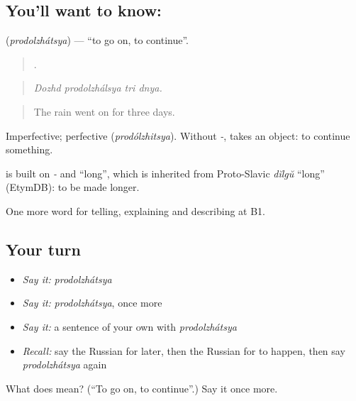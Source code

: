 \subsection*{You'll want to know: }
\textbf{} (\emph{prodolzhátsya}) — \textquotedblleft{}to go on, to continue\textquotedblright{}.

\begin{quote}
   .
\end{quote}

\begin{quote}
\emph{Dozhd prodolzhálsya tri dnya.}
\end{quote}

\begin{quote}
The rain went on for three days.
\end{quote}

Imperfective; perfective \emph{} (\emph{prodólzhitsya}). Without \emph{-}, \emph{} takes an object: to continue something.

\begin{cousinweb}
\emph{} is built on \emph{-} and \emph{} \textquotedblleft{}long\textquotedblright{}, which is inherited from Proto-Slavic \emph{dĭlgŭ} \textquotedblleft{}long\textquotedblright{} (EtymDB): to be made longer.
\end{cousinweb}

\begin{grammarlens}[title={What you've built}]
One more word for telling, explaining and describing at B1.
\end{grammarlens}

\subsection*{Your turn}
\begin{itemize}
\raggedright
  \item \emph{Say it:} \emph{prodolzhátsya}
  \item \emph{Say it:} \emph{prodolzhátsya}, once more
  \item \emph{Say it:} a sentence of your own with \emph{prodolzhátsya}
  \item \emph{Recall:} say the Russian for later, then the Russian for to happen, then say \emph{prodolzhátsya} again
\end{itemize}

\begin{tcolorbox}[breakable,colback=teal!4,colframe=teal!35!black,title={Before you move on}]
What does  mean? (\textquotedblleft{}To go on, to continue\textquotedblright{}.) Say it once more.
\end{tcolorbox}
